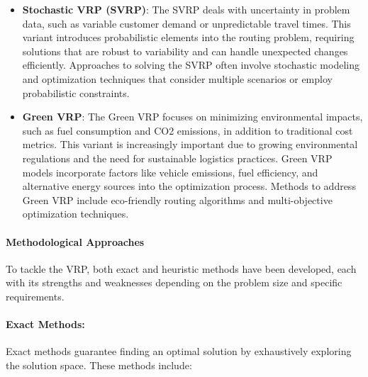 \documentclass[
]{article}
\begin{document}
\begin{itemize}
        \item \textbf{Stochastic VRP (SVRP)}:
        The SVRP deals with uncertainty in problem data, such as variable customer demand or unpredictable travel times. This variant introduces probabilistic elements into the routing problem, requiring solutions that are robust to variability and can handle unexpected changes efficiently. Approaches to solving the SVRP often involve stochastic modeling and optimization techniques that consider multiple scenarios or employ probabilistic constraints.

        \item \textbf{Green VRP}:
        The Green VRP focuses on minimizing environmental impacts, such as fuel consumption and CO2 emissions, in addition to traditional cost metrics. This variant is increasingly important due to growing environmental regulations and the need for sustainable logistics practices. Green VRP models incorporate factors like vehicle emissions, fuel efficiency, and alternative energy sources into the optimization process. Methods to address Green VRP include eco-friendly routing algorithms and multi-objective optimization techniques.

    \end{itemize}

    \paragraph{Methodological Approaches}
    To tackle the VRP, both exact and heuristic methods have been developed, each with its strengths and weaknesses depending on the problem size and specific requirements.

    \paragraph{Exact Methods:}
    Exact methods guarantee finding an optimal solution by exhaustively exploring the solution space. These methods include:
\end{document}
